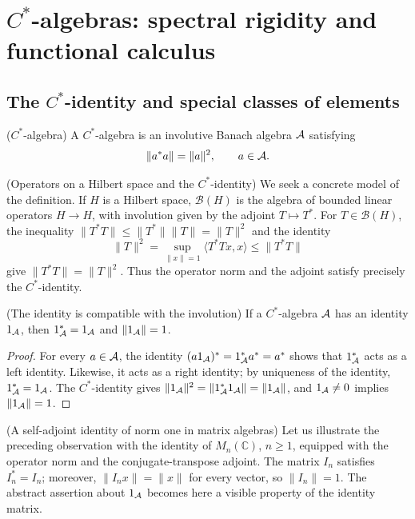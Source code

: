 \chapter{\texorpdfstring{$C^*$}{C*}-algebras: spectral rigidity and functional calculus}

\section{The \texorpdfstring{$C^*$}{C*}-identity and special classes of elements}

\begin{cthdefinicion}{($C^*$-algebra)}
A $C^*$-algebra is an involutive Banach algebra $\mathcal A$ satisfying
\[
 \|a^*a\|=\|a\|^2,
 \qquad a\in\mathcal A.
\]
\end{cthdefinicion}

\begin{cthejemplo}{(Operators on a Hilbert space and the $C^*$-identity)}
We seek a concrete model of the definition. If $H$ is a
Hilbert space, $\mathcal B(H)$ is the algebra of bounded linear operators
$H\to H$, with involution given by the adjoint $T\mapsto T^*$.
For $T\in\mathcal B(H)$, the inequality
$\|T^*T\|\le\|T^*\|\|T\|=\|T\|^2$ and the identity
\[
 \|T\|^2=\sup_{\|x\|=1}\langle T^*Tx,x\rangle
 \le\|T^*T\|
\]
give $\|T^*T\|=\|T\|^2$. Thus the operator norm and the adjoint
satisfy precisely the $C^*$-identity.
\end{cthejemplo}

\begin{cthobservacion}{(The identity is compatible with the involution)}
If a $C^*$-algebra $\mathcal A$ has an identity $1_\mathcal A$, then
$1_\mathcal A^*=1_\mathcal A$ and $\|1_\mathcal A\|=1$.
\end{cthobservacion}

\begin{proof}[Proof]
For every $a\in\mathcal A$, the identity $(a1_\mathcal A)^*=1_\mathcal A^*a^*=a^*$ shows that
$1_\mathcal A^*$ acts as a left identity. Likewise, it acts as a right identity;
by uniqueness of the identity, $1_\mathcal A^*=1_\mathcal A$. The $C^*$-identity gives
$\|1_\mathcal A\|^2=\|1_\mathcal A^*1_\mathcal A\|=\|1_\mathcal A\|$, and $1_\mathcal A\ne0$ implies
$\|1_\mathcal A\|=1$.
\end{proof}

\begin{cthejemplo}{(A self-adjoint identity of norm one in matrix algebras)}
Let us illustrate the preceding observation with the identity of
$M_n(\mathbb C)$, $n\ge1$, equipped with the operator norm and the
conjugate-transpose adjoint. The matrix $I_n$ satisfies
$I_n^*=I_n$; moreover, $\|I_nx\|=\|x\|$ for every vector, so
$\|I_n\|=1$. The abstract assertion about $1_\mathcal A$ becomes here
a visible property of the identity matrix.
\end{cthejemplo}

